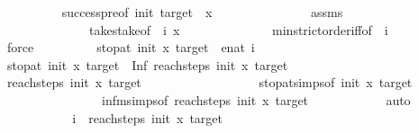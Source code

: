 \begin{isabellebody}
\ \ \ \ \ \ \ \ \isamarkupfalse%
\ success{\isacharunderscore}{\kern0pt}pre{\isacharbrackleft}{\kern0pt}of\ init\ target\ {\isacharunderscore}{\kern0pt}\ x{\isacharbrackright}{\kern0pt}\ \isanewline
\ \ \ \ \ \ \ \ \ \ \ \ \ \ assms\isanewline
\ \ \ \ \ \ \ \ \ \ \ \ \ \ take{\isacharunderscore}{\kern0pt}stake{\isacharbrackleft}{\kern0pt}of\ {\isacharunderscore}{\kern0pt}\ i\ x{\isacharbrackright}{\kern0pt}\isanewline
\ \ \ \ \ \ \ \ \ \ \ \ \ \ min{\isachardot}{\kern0pt}strict{\isacharunderscore}{\kern0pt}order{\isacharunderscore}{\kern0pt}iff{\isacharbrackleft}{\kern0pt}of\ {\isacharunderscore}{\kern0pt}\ i{\isacharbrackright}{\kern0pt}\isanewline
\ \ \ \ \ \ \ \ \isamarkupfalse%
\ force\isanewline
\ \ \ \ \ \ \isamarkupfalse%
\ \isamarkupfalse%
\ {\isachardoublequoteopen}stop{\isacharunderscore}{\kern0pt}at\ {\isacharparenleft}{\kern0pt}init{\isacharparenright}{\kern0pt}\ x\ {\isacharparenleft}{\kern0pt}target{\isacharparenright}{\kern0pt}\ {\isacharequal}{\kern0pt}\ enat\ i{\isachardoublequoteclose}\isanewline
\ \ \ \ \ \ \isamarkupfalse%
\ \isanewline
\ \ \ \ \ \ \ \ \isamarkupfalse%
\ {\isachardoublequoteopen}stop{\isacharunderscore}{\kern0pt}at\ {\isacharparenleft}{\kern0pt}init{\isacharparenright}{\kern0pt}\ x\ {\isacharparenleft}{\kern0pt}target{\isacharparenright}{\kern0pt}\ {\isacharequal}{\kern0pt}\ Inf\ {\isacharparenleft}{\kern0pt}reach{\isacharunderscore}{\kern0pt}steps\ init\ x\ target{\isacharparenright}{\kern0pt}\ {\isachardoublequoteclose}\isanewline
\ \ \ \ \ \ \ \ \ \ \isamarkupfalse%
\ {\isacartoucheopen}reach{\isacharunderscore}{\kern0pt}steps\ init\ x\ target\ {\isasymnoteq}\ {\isacharbraceleft}{\kern0pt}{\isacharbraceright}{\kern0pt}{\isacartoucheclose}\isanewline
\ \ \ \ \ \ \ \ \ \ \ \ \ \ \ \ stop{\isacharunderscore}{\kern0pt}at{\isachardot}{\kern0pt}simps{\isacharbrackleft}{\kern0pt}of\ init\ x\ target{\isacharbrackright}{\kern0pt}\isanewline
\ \ \ \ \ \ \ \ \ \ \ \ \ \ \ \ infm{\isachardot}{\kern0pt}simps{\isacharbrackleft}{\kern0pt}of\ {\isachardoublequoteopen}reach{\isacharunderscore}{\kern0pt}steps\ init\ x\ target{\isachardoublequoteclose}{\isacharbrackright}{\kern0pt}\isanewline
\ \ \ \ \ \ \ \ \ \ \isamarkupfalse%
\ auto\isanewline
\ \ \ \ \ \ \ \ \isamarkupfalse%
\ \isamarkupfalse%
\ {\isachardoublequoteopen}i\ {\isasymin}\ reach{\isacharunderscore}{\kern0pt}steps\ init\ x\ target{\isachardoublequoteclose}\isanewline
\ \ \ \ \ \ \ \ \ \ \isamarkupfalse%

\end{isabellebody}
